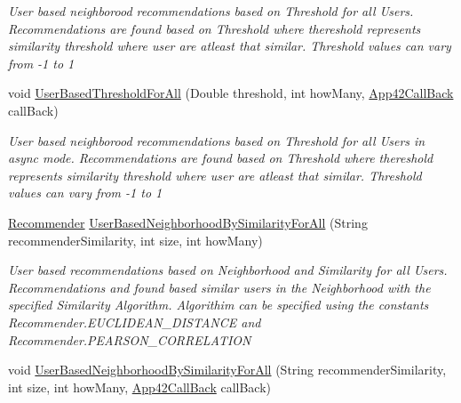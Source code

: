 \begin{DoxyCompactItemize}
\begin{DoxyCompactList}\small\item\em User based neighborood recommendations based on Threshold for all Users. Recommendations are found based on Threshold where thereshold represents similarity threshold where user are atleast that similar. Threshold values can vary from -\/1 to 1 \end{DoxyCompactList}\item 
void \hyperlink{classcom_1_1shephertz_1_1app42_1_1paas_1_1sdk_1_1csharp_1_1recommend_1_1_recommender_service_a82def03aa4a4cc01994c853de5d2c8c6}{User\+Based\+Threshold\+For\+All} (Double threshold, int how\+Many, \hyperlink{interfacecom_1_1shephertz_1_1app42_1_1paas_1_1sdk_1_1csharp_1_1_app42_call_back}{App42\+Call\+Back} call\+Back)
\begin{DoxyCompactList}\small\item\em User based neighborood recommendations based on Threshold for all Users in async mode. Recommendations are found based on Threshold where thereshold represents similarity threshold where user are atleast that similar. Threshold values can vary from -\/1 to 1 \end{DoxyCompactList}\item 
\hyperlink{classcom_1_1shephertz_1_1app42_1_1paas_1_1sdk_1_1csharp_1_1recommend_1_1_recommender}{Recommender} \hyperlink{classcom_1_1shephertz_1_1app42_1_1paas_1_1sdk_1_1csharp_1_1recommend_1_1_recommender_service_a075770897fad454c82d0f3e216c510d0}{User\+Based\+Neighborhood\+By\+Similarity\+For\+All} (String recommender\+Similarity, int size, int how\+Many)
\begin{DoxyCompactList}\small\item\em User based recommendations based on Neighborhood and Similarity for all Users. Recommendations and found based similar users in the Neighborhood with the specified Similarity Algorithm. Algorithim can be specified using the constants Recommender.\+E\+U\+C\+L\+I\+D\+E\+A\+N\+\_\+\+D\+I\+S\+T\+A\+N\+C\+E and Recommender.\+P\+E\+A\+R\+S\+O\+N\+\_\+\+C\+O\+R\+R\+E\+L\+A\+T\+I\+O\+N \end{DoxyCompactList}\item 
void \hyperlink{classcom_1_1shephertz_1_1app42_1_1paas_1_1sdk_1_1csharp_1_1recommend_1_1_recommender_service_ae4366496053a6fd1d1598764f87d5914}{User\+Based\+Neighborhood\+By\+Similarity\+For\+All} (String recommender\+Similarity, int size, int how\+Many, \hyperlink{interfacecom_1_1shephertz_1_1app42_1_1paas_1_1sdk_1_1csharp_1_1_app42_call_back}{App42\+Call\+Back} call\+Back)

\end{DoxyCompactItemize}

